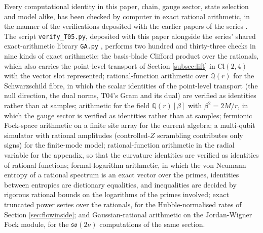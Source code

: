 \documentclass[11pt]{article}
\theoremstyle{definition}
\newcommand{\Cl}{\mathrm{Cl}}
\begin{document}
Every computational identity in this paper, chain, gauge sector, state selection and model alike, has been checked by computer in exact rational arithmetic, in the manner of the verifications deposited with the earlier papers of the series \cite{ButlerT1, ButlerT3, ButlerT4}. The script \texttt{verify\_T05.py}, deposited with this paper alongside the series' shared exact-arithmetic library \texttt{GA.py} \cite{ButlerVerifyT05}, performs two hundred and thirty-three checks in nine kinds of exact arithmetic: the basis-blade Clifford product over the rationals, which also carries the point-level transport of Section \ref{subsec:lift} in $\Cl(2,4)$ with the vector slot represented; rational-function arithmetic over $\mathbb{Q}(r)$ for the Schwarzschild fibre, in which the scalar identities of the point-level transport (the null direction, the dual norms, T04's Gram and its dual) are verified as identities rather than at samples; arithmetic for the field $\mathbb{Q}(r)[\beta]$ with $\beta^2 = 2M/r$, in which the gauge sector is verified as identities rather than at samples; fermionic Fock-space arithmetic on a finite site array for the current algebra; a multi-qubit simulator with rational amplitudes (controlled-$Z$ scrambling contributes only signs) for the finite-mode model; rational-function arithmetic in the radial variable for the appendix, so that the curvature identities are verified as identities of rational functions; formal-logarithm arithmetic, in which the von Neumann entropy of a rational spectrum is an exact vector over the primes, identities between entropies are dictionary equalities, and inequalities are decided by rigorous rational bounds on the logarithms of the primes involved; exact truncated power series over the rationals, for the Hubble-normalised rates of Section \ref{sec:flowinside}; and Gaussian-rational arithmetic on the Jordan-Wigner Fock module, for the $\mathfrak{so}(2\nu)$ computations of the same section.
\end{document}
